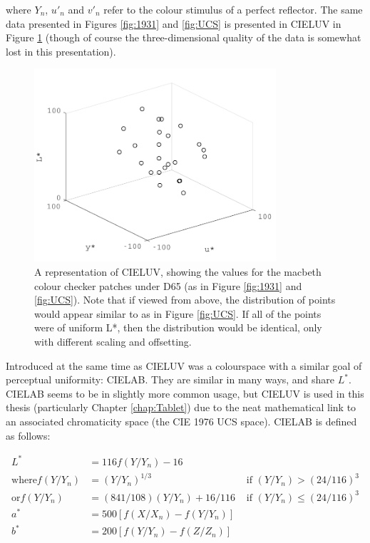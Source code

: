 where $Y_{n}$, $u'_{n}$ and $v'_{n}$ refer to the colour stimulus of a perfect reflector. The same data presented in Figures \ref{fig:1931} and \ref{fig:UCS} is presented in CIELUV in Figure \ref{fig:CIELUV} (though of course the three-dimensional quality of the data is somewhat lost in this presentation). 

\begin{figure}[hbtp]
\includegraphics[max width=0.8\textwidth]{figs/LitRev/ColorimetryDemo4.pdf}
\caption{A representation of CIELUV, showing the values for the macbeth colour checker patches under D65 (as in Figure \ref{fig:1931} and \ref{fig:UCS}). Note that if viewed from above, the distribution of points would appear similar to as in Figure \ref{fig:UCS}. If all of the points were of uniform L*, then the distribution would be identical, only with different scaling and offsetting.}
\label{fig:CIELUV}
\end{figure}

Introduced at the same time as CIELUV was a colourspace with a similar goal of perceptual uniformity: CIELAB. They are similar in many ways, and share $L^{*}$. CIELAB seems to be in slightly more common usage, but CIELUV is used in this thesis (particularly Chapter \ref{chap:Tablet}) due to the neat mathematical link to an associated chromaticity space (the CIE 1976 UCS space). CIELAB is defined as follows:

\begin{subequations}
\begin{align}
L^{*} &= 116 f(Y/Y_{n})-16 \\
\textrm{where} f(Y/Y_{n}) &= (Y/Y_{n})^{1/3} &\textrm{ if } (Y/Y_{n}) > (24/116)^{3} \\
\textrm{or} f(Y/Y_{n}) &= (841/108)(Y/Y_{n})+16/116 &\textrm{ if } (Y/Y_{n}) \leq (24/116)^{3} \\
a^{*} &= 500[f(X/X_{n}) - f(Y/Y_{n})] \\ 
b^{*} &= 200[f(Y/Y_{n}) - f(Z/Z_{n})] \\
\end{align}
\end{subequations}

